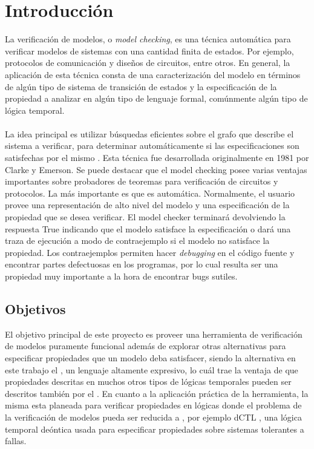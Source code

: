 \chapter{Introducción}
\noindent La verificación de modelos, o \emph{model checking}, es una técnica automática para verificar modelos de sistemas con una cantidad finita de estados. Por ejemplo, protocolos de comunicación y diseños de circuitos, entre otros. En general, la aplicación de esta técnica consta de una caracterización del modelo en términos de algún tipo de sistema de transición de estados y la especificación de la propiedad a analizar en algún tipo de lenguaje formal, comúnmente algún tipo de lógica temporal.\\
\\
\noindent La idea principal es utilizar búsquedas eficientes sobre el grafo que describe el sistema a verificar, para determinar automáticamente si las especificaciones son satisfechas por el mismo \cite{Clarke:5}. Esta técnica fue desarrollada originalmente en 1981 por Clarke y Emerson. Se puede destacar que el model checking posee varias ventajas importantes sobre probadores de teoremas para verificación de circuitos y protocolos. La más importante es que es automática. Normalmente, el usuario provee una representación de alto nivel del modelo y una especificación de la propiedad que se desea verificar. El model checker terminará devolviendo la respuesta True indicando que el modelo satisface la especificación o dará una traza de ejecución a modo de contraejemplo si el modelo no satisface la propiedad. Los contraejemplos permiten hacer \emph{debugging} en el código fuente y encontrar partes defectuosas en los programas, por lo cual resulta ser una propiedad muy importante a la hora de encontrar bugs sutiles.

\section{Objetivos}
El objetivo principal de este proyecto es proveer una herramienta de verificación de modelos puramente funcional además de explorar otras alternativas para especificar propiedades que un modelo deba satisfacer, siendo la alternativa en este trabajo el {\mucalculo}, un lenguaje altamente expresivo, lo cuál trae la ventaja de que propiedades descritas en muchos otros tipos de lógicas temporales pueden ser descritos también por el {\mucalculo}. En cuanto a la aplicación práctica de la herramienta, la misma esta planeada para verificar propiedades en lógicas donde el problema de la verificación de modelos pueda ser reducida a {\mucalculo}, por ejemplo dCTL \cite{Castro:9}, una lógica temporal deóntica usada para especificar propiedades sobre sistemas tolerantes a fallas.

